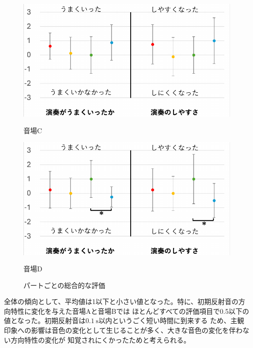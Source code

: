 \documentclass[11pt,a4j]{jreport}
\begin{document}
\begin{figure}[H]
    \vspace{1\baselineskip}

    \begin{minipage}{.5\linewidth}
      \centering
      \includegraphics[scale=.55]{images/subjectiveExp/statisticAnalysis/part_overall_c.pdf}
      \caption*{音場C}
      \label{fig:総合的な評価C}
    \end{minipage}%
    \begin{minipage}{.5\linewidth}
      \centering
      \includegraphics[scale=.55]{images/subjectiveExp/statisticAnalysis/part_overall_d.pdf}
      \caption*{音場D}
      \label{fig:総合的な評価D}
    \end{minipage}
    
    \caption{パートごとの総合的な評価}
    \label{fig:パートごとの総合的な評価}
    
  \end{figure}

  
\clearpage
  全体の傾向として、平均値は1以下と小さい値となった。特に、初期反射音の方向特性に変化を与えた音場Aと音場Bでは
  ほとんどすべての評価項目で0.5以下の値となった。初期反射音は$\SI{0.1}{\second}$以内というごく短い時間に到来する
  ため、主観印象への影響は音色の変化として生じることが多く、大きな音色の変化を伴わない方向特性の変化が
  知覚されにくかったためと考えられる。
  
\end{document}
